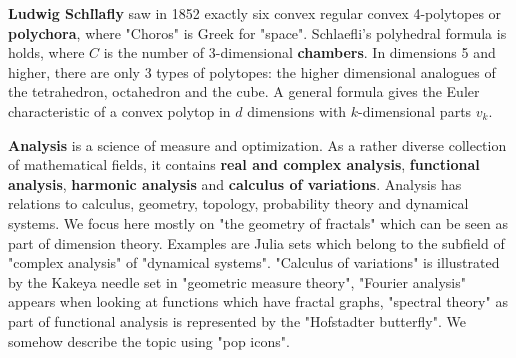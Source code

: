 \documentclass[12pt]{amsart}
\def\chapter#1{ \vspace{2mm} \begin{center} \fcolorbox{green1}{green1}{ \parbox{16.2cm}{{\Large {\bf #1}}}} \vspace{2mm} \end{center} }
\begin{document}
\begin{small}
\begin{center}  \end{center}
\end{small}
{\bf Ludwig Schl\"lafly} saw in 1852 exactly six convex regular convex 4-polytopes or
{\bf polychora}, where "Choros" is Greek for "space". Schlaefli's polyhedral formula is
holds, where $C$ is the number of 3-dimensional {\bf chambers}. 
In dimensions 5 and higher, there are only 3 types of polytopes: the higher dimensional analogues of 
the tetrahedron, octahedron and the cube. A general formula 
gives the Euler characteristic of a convex polytop in $d$ dimensions with $k$-dimensional parts $v_k$. 


 \pagebreak
{}

\chapter{Lecture 10: Analysis}

{\bf Analysis} is a science of measure and optimization. As a rather diverse 
collection of mathematical fields, it contains {\bf real and complex analysis}, {\bf functional analysis}, 
{\bf harmonic analysis} and {\bf calculus of variations}.
Analysis has relations to calculus, geometry, topology, probability theory and dynamical systems.
We focus here mostly on "the geometry of fractals" which can be seen as part of dimension theory.
Examples are Julia sets which belong to the subfield of "complex analysis" of "dynamical systems".
"Calculus of variations" is illustrated by the Kakeya needle set in "geometric measure theory",
"Fourier analysis" appears when looking at functions which have fractal graphs, 
"spectral theory" as part of functional analysis is represented by the "Hofstadter butterfly".
We somehow describe the topic using "pop icons". \\
\end{document}
